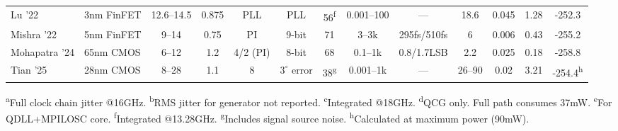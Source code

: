 \begin{table}[h]
{\begin{tabular}{@{}l l c S[table-format=1.2] c c c S[table-format=2.1] S[table-format=1.3] S[table-format=1.2] c S[table-format=-3.1] S[table-format=-3.1] @{}}
  Lu '22 \cite{Lu2022JSSC} & 3nm FinFET & 12.6--14.5 & 0.875 & PLL & PLL & 56\textsuperscript{f} & {0.001--100} & {---} & 18.6 & 0.045 & 1.28 & -252.3 \\

  Mishra '22 \cite{Mishra2022ISSCC} & 5nm FinFET & 9--14 & 0.75 & PI & 9-bit & 71 & {3--3k} & {295fs/510fs} & 6 & 0.006 & 0.43 & -255.2 \\

  Mohapatra '24 \cite{Mohapatra2024ISSCC} & 65nm CMOS & 6--12 & 1.2 & 4/2 (PI) & 8-bit & 68 & {0.1--1k} & {0.8/1.7LSB} & 2.2 & 0.025 & 0.18 & -258.8 \\

  Tian '25 \cite{Tian2025ISSCC} & 28nm CMOS & 8--28 & 1.1 & 8 & $3^{\circ}$ error & 38\textsuperscript{g} & {0.001--1k} & {---} & {26--90} & 0.02 & 3.21 & -254.4\textsuperscript{h} \\

  \bottomrule
 \end{tabular}
}
\vspace{0.5em}
\begin{minipage}{\textwidth}
\footnotesize
 \textsuperscript{a}Full clock chain jitter @16GHz.
 \textsuperscript{b}RMS jitter for generator not reported.
 \textsuperscript{c}Integrated @18GHz.
 \textsuperscript{d}QCG only. Full path consumes 37mW.
 \textsuperscript{e}For QDLL+MPILOSC core.
 \textsuperscript{f}Integrated @13.28GHz.
 \textsuperscript{g}Includes signal source noise.
 \textsuperscript{h}Calculated at maximum power (90mW).
\end{minipage}
\end{table}
